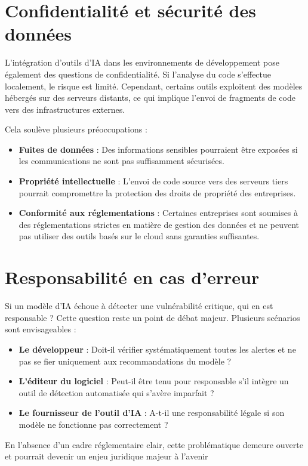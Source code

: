 \section{Confidentialité et sécurité des données}



L’intégration
d’outils d’IA dans les environnements de développement pose également des
questions de confidentialité. Si l’analyse du code s’effectue localement, le
risque est limité. Cependant, certains outils exploitent des modèles hébergés
sur des serveurs distants, ce qui implique l’envoi de fragments de code vers
des infrastructures externes.



Cela soulève
plusieurs préoccupations :



\begin{itemize}

 \item \textbf{Fuites
     de données} : Des informations sensibles pourraient être
     exposées si les communications ne sont pas suffisamment sécurisées.

 \item \textbf{Propriété
     intellectuelle} : L'envoi de code source vers des serveurs tiers
     pourrait compromettre la protection des droits de propriété des
     entreprises.

 \item \textbf{Conformité
     aux réglementations} : Certaines entreprises sont soumises à des
     réglementations strictes en matière de gestion des données et ne peuvent
     pas utiliser des outils basés sur le cloud sans garanties suffisantes.

\end{itemize}


\section{Responsabilité en cas d’erreur}



Si un modèle
d’IA échoue à détecter une vulnérabilité critique, qui en est responsable ?
Cette question reste un point de débat majeur. Plusieurs scénarios sont
envisageables :



\begin{itemize}

 \item \textbf{Le
     développeur} : Doit-il vérifier systématiquement toutes les
     alertes et ne pas se fier uniquement aux recommandations du modèle ?

 \item \textbf{L’éditeur
     du logiciel} : Peut-il être tenu pour responsable s’il
     intègre un outil de détection automatisée qui s’avère imparfait ?

 \item \textbf{Le
     fournisseur de l’outil d’IA} : A-t-il une responsabilité légale si son modèle
     ne fonctionne pas correctement ?

\end{itemize}


En l’absence d’un cadre réglementaire clair, cette problématique demeure ouverte et pourrait
devenir un enjeu juridique majeur à l’avenir




